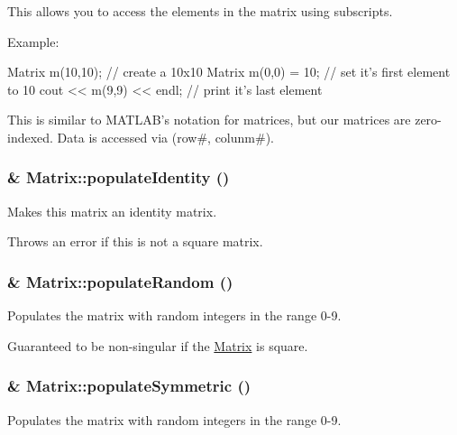 This allows you to access the elements in the matrix using subscripts. 

Example: 
\begin{DoxyCode}
                Matrix m(10,10);        // create a 10x10 Matrix
                m(0,0) = 10;            // set it's first element to 10
                cout << m(9,9) << endl; // print it's last element
\end{DoxyCode}
 This is similar to MATLAB's notation for matrices, but our matrices are zero-\/indexed. Data is accessed via (row\#, colunm\#). \hypertarget{class_matrix_a0ee71091770a4e83e54860f291ef1b7d}{
\subsubsection[{populateIdentity}]{ \& Matrix::populateIdentity ()}}
\label{class_matrix_a0ee71091770a4e83e54860f291ef1b7d}


Makes this matrix an identity matrix. 

Throws an error if this is not a square matrix. \hypertarget{class_matrix_a375fc575a7e042d0eed3d76c7470e59f}{
\subsubsection[{populateRandom}]{ \& Matrix::populateRandom ()}}
\label{class_matrix_a375fc575a7e042d0eed3d76c7470e59f}


Populates the matrix with random integers in the range 0-\/9. 

Guaranteed to be non-\/singular if the \hyperlink{class_matrix}{Matrix} is square. \hypertarget{class_matrix_abeb4729f525e85a0f1f516675677e105}{
\subsubsection[{populateSymmetric}]{ \& Matrix::populateSymmetric ()}}
\label{class_matrix_abeb4729f525e85a0f1f516675677e105}


Populates the matrix with random integers in the range 0-\/9. 

